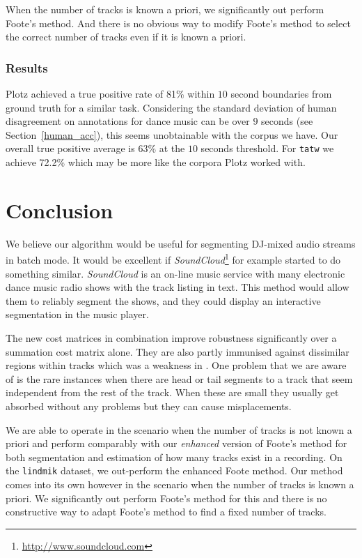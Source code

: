 \documentclass[twocolumn]{article}
\begin{document}
When the number of tracks is known a priori, we significantly out perform Foote's method. And there is no obvious way to modify Foote's method to select the correct number of tracks even if it is known a priori. 

\subsubsection{Results}

Plotz \citep{plotz2006automatic} achieved a true positive rate of 81\% within $10$ second boundaries from ground truth for a similar task. Considering the standard deviation of human disagreement on annotations for dance music can be over $9$ seconds (see Section~\ref{human_acc}), this seems unobtainable with the corpus we have. Our overall true positive average is 63\% at the $10$ seconds threshold. For \texttt{tatw} we achieve 72.2\% which may be more like the corpora Plotz worked with.

\section{Conclusion}\label{conclusions}

We believe our algorithm would be useful for segmenting DJ-mixed audio streams in batch mode. It would be excellent if \textit{SoundCloud}\footnote{\url{http://www.soundcloud.com}} for example started to do something similar. \textit{SoundCloud} is an on-line music service with many electronic dance music radio shows with the track listing in text. This method would allow them to reliably segment the shows, and they could display an interactive segmentation in the music player. 

The new cost matrices in combination improve robustness significantly over a summation cost matrix alone. They are also partly immunised against dissimilar regions within tracks which was a weakness in \citep{scarfe2013long}. One problem that we are aware of is the rare instances when there are head or tail segments to a track that seem independent from the rest of the track. When these are small they usually get absorbed without any problems but they can cause misplacements.

We are able to operate in the scenario when the number of tracks is not known a priori and perform comparably with our \textit{enhanced} version of Foote's \citep{foote2003media} method for both segmentation and estimation of how many tracks exist in a recording. On the \texttt{lindmik} dataset, we out-perform the enhanced Foote method. Our method comes into its own however in the scenario when the number of tracks is known a priori. We significantly out perform Foote's method for this and there is no constructive way to adapt Foote's method to find a fixed number of tracks. 
\end{document}
